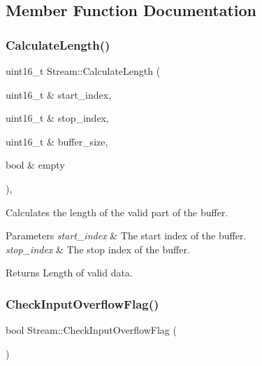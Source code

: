 \subsection{Member Function Documentation}
\hypertarget{class_stream_a8047b62e7dcfe0e50210b3e40c7aa6eb}{}\label{class_stream_a8047b62e7dcfe0e50210b3e40c7aa6eb} 
\subsubsection{\texorpdfstring{Calculate\+Length()}{CalculateLength()}}
{\footnotesize\ttfamily uint16\+\_\+t Stream\+::\+Calculate\+Length (\begin{DoxyParamCaption}\item[{uint16\+\_\+t \&}]{start\+\_\+index,  }\item[{uint16\+\_\+t \&}]{stop\+\_\+index,  }\item[{uint16\+\_\+t \&}]{buffer\+\_\+size,  }\item[{bool \&}]{empty }\end{DoxyParamCaption})\hspace{0.3cm}{\ttfamily [protected]}, {\ttfamily [virtual]}}

Calculates the length of the valid part of the buffer. 
\begin{DoxyParams}{Parameters}
{\em start\+\_\+index} & The start index of the buffer. \\
\hline
{\em stop\+\_\+index} & The stop index of the buffer. \\
\hline
\end{DoxyParams}
\begin{DoxyReturn}{Returns}
Length of valid data. 
\end{DoxyReturn}
\hypertarget{class_stream_a088c4e68d568acfad715c56f408fe9f8}{}\label{class_stream_a088c4e68d568acfad715c56f408fe9f8} 
\subsubsection{\texorpdfstring{Check\+Input\+Overflow\+Flag()}{CheckInputOverflowFlag()}}
{\footnotesize\ttfamily bool Stream\+::\+Check\+Input\+Overflow\+Flag (\begin{DoxyParamCaption}{ }\end{DoxyParamCaption})\hspace{0.3cm}{\ttfamily [virtual]}}

